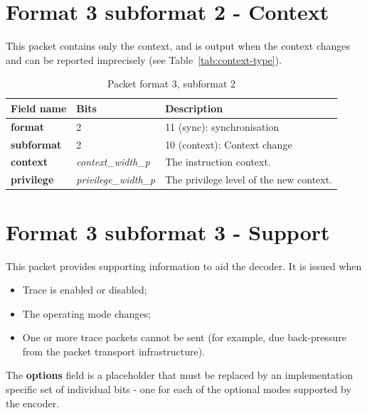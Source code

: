 \FloatBarrier
\section{Format 3 subformat 2 - Context} \label{sec:format32}

This packet contains only the context, and is output when the context changes and can be reported imprecisely (see Table~\ref{tab:context-type}).

\begin{table}[htp]
  \centering
  \caption{Packet format 3, subformat 2}
  \label{tab:te_inst3}
  \begin{tabulary}{\textwidth}{|l|p{35mm}|p{90mm}|}
    \hline
    {\bf Field name} & {\bf Bits} & {\bf Description} \\
    \hline
    \textbf{format} & 2 & 11 (sync): synchronisation\\
    \hline
    \textbf{subformat}  & 2 & 10 (context): Context change \\
    \hline
    \textbf{context} &  \textit {context\_width\_p} & The instruction context. \\
    \hline
    \textbf{privilege} & \textit {privilege\_width\_p} & 
                The privilege level of the new context.\\
    \hline
  \end{tabulary}
\end{table}

\section{Format 3 subformat 3 - Support} \label{sec:format33}

This packet provides supporting information to aid the decoder.  It is issued when

\begin{itemize}
  \item Trace is enabled or disabled;
  \item The operating mode changes;
  \item One or more trace packets cannot be sent (for example, due back-pressure from the packet transport infrastructure).
\end{itemize}

The \textbf{options} field is a placeholder that must be replaced by an implementation specific set of individual bits - one for each of the
optional modes supported by the encoder.

